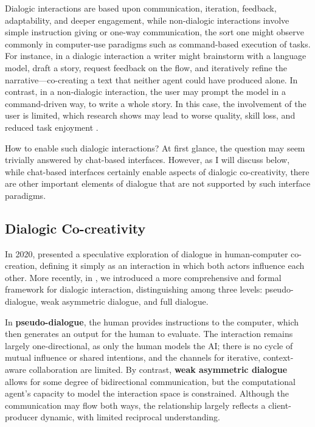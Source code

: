 Dialogic interactions are based upon communication, iteration, feedback, adaptability, and deeper engagement, while non-dialogic interactions involve simple instruction giving or one-way communication, the sort one might observe commonly in computer-use paradigms such as command-based execution of tasks. For instance, in a dialogic interaction a writer might brainstorm with a language model, draft a story, request feedback on the flow, and iteratively refine the narrative—co-creating a text that neither agent could have produced alone. In contrast, in a non-dialogic interaction, the user may prompt the model in a command-driven way, to write a whole story. In this case, the involvement of the user is limited, which research shows may lead to worse quality, skill loss, and reduced task enjoyment \cite{Abbas2024-sf, Heersmink2024-mk, DellAcqua2023-og}. 

How to enable such dialogic interactions? At first glance, the question may seem trivially answered by chat-based interfaces. However, as I will discuss below, while chat-based interfaces certainly enable aspects of dialogic co-creativity, there are other important elements of dialogue that are not supported by such interface paradigms.

\subsection{Dialogic Co-creativity}

In 2020, \cite{Bown2020-zn} presented a speculative exploration of dialogue in human-computer co-creation, defining it simply as an interaction in which both actors influence each other. More recently, in \cite{Bown2024-yx}, we introduced a more comprehensive and formal framework for dialogic interaction, distinguishing among three levels: pseudo-dialogue, weak asymmetric dialogue, and full dialogue.

In \textbf{pseudo-dialogue}, the human provides instructions to the computer, which then generates an output for the human to evaluate. The interaction remains largely one-directional, as only the human models the AI; there is no cycle of mutual influence or shared intentions, and the channels for iterative, context-aware collaboration are limited. By contrast, \textbf{weak asymmetric dialogue} allows for some degree of bidirectional communication, but the computational agent's capacity to model the interaction space is constrained. Although the communication may flow both ways, the relationship largely reflects a client-producer dynamic, with limited reciprocal understanding.

